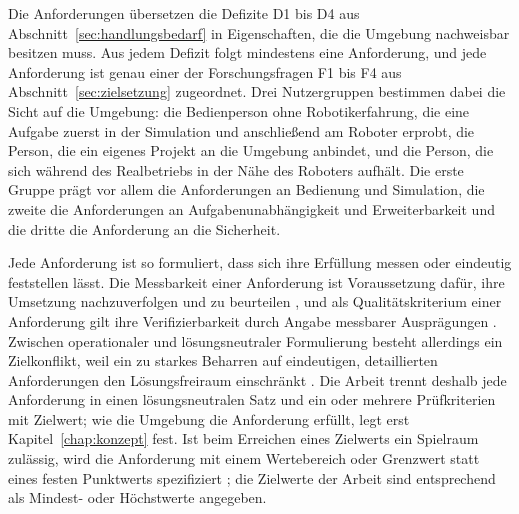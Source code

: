 
Die Anforderungen übersetzen die Defizite D1 bis D4 aus Abschnitt~\ref{sec:handlungsbedarf} in Eigenschaften, die die Umgebung nachweisbar besitzen muss.
Aus jedem Defizit folgt mindestens eine Anforderung, und jede Anforderung ist genau einer der Forschungsfragen F1 bis F4 aus Abschnitt~\ref{sec:zielsetzung} zugeordnet.
Drei Nutzergruppen bestimmen dabei die Sicht auf die Umgebung: die Bedienperson ohne Robotikerfahrung, die eine Aufgabe zuerst in der Simulation und anschließend am Roboter erprobt, die Person, die ein eigenes Projekt an die Umgebung anbindet, und die Person, die sich während des Realbetriebs in der Nähe des Roboters aufhält.
Die erste Gruppe prägt vor allem die Anforderungen an Bedienung und Simulation, die zweite die Anforderungen an Aufgabenunabhängigkeit und Erweiterbarkeit und die dritte die Anforderung an die Sicherheit.

Jede Anforderung ist so formuliert, dass sich ihre Erfüllung messen oder eindeutig feststellen lässt.
Die Messbarkeit einer Anforderung ist Voraussetzung dafür, ihre Umsetzung nachzuverfolgen und zu beurteilen \cite{Bender2021}, und als Qualitätskriterium einer Anforderung gilt ihre Verifizierbarkeit durch Angabe messbarer Ausprägungen \cite{Bender2021}.
Zwischen operationaler und lösungsneutraler Formulierung besteht allerdings ein Zielkonflikt, weil ein zu starkes Beharren auf eindeutigen, detaillierten Anforderungen den Lösungsfreiraum einschränkt \cite{Bender2021}.
Die Arbeit trennt deshalb jede Anforderung in einen lösungsneutralen Satz und ein oder mehrere Prüfkriterien mit Zielwert; wie die Umgebung die Anforderung erfüllt, legt erst Kapitel~\ref{chap:konzept} fest.
Ist beim Erreichen eines Zielwerts ein Spielraum zulässig, wird die Anforderung mit einem Wertebereich oder Grenzwert statt eines festen Punktwerts spezifiziert \cite{Bender2021}; die Zielwerte der Arbeit sind entsprechend als Mindest- oder Höchstwerte angegeben.

